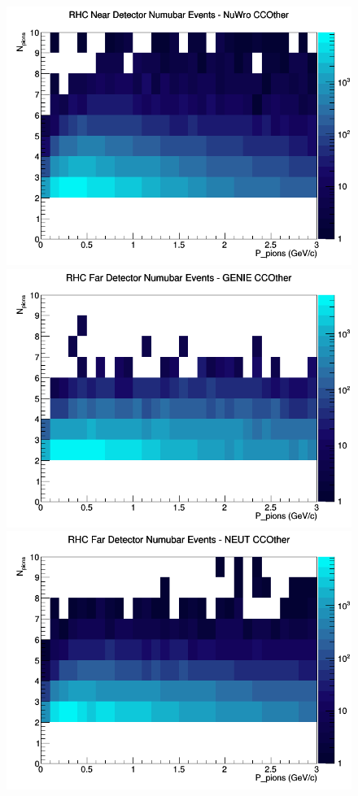 \documentclass[12pt]{article}
\begin{document}
\begin{figure}[h]
\includegraphics[width=\linewidth]{N_P/nominal/pions/CCOther_RHC_ND_numubar_N_P_NuWro.png}
\endminipage
\newline
{}
\includegraphics[width=\linewidth]{N_P/nominal/pions/CCOther_RHC_FD_numubar_N_P_GENIE.png}
\endminipage
{}
\includegraphics[width=\linewidth]{N_P/nominal/pions/CCOther_RHC_FD_numubar_N_P_NEUT.png}

\end{figure}
\end{document}
